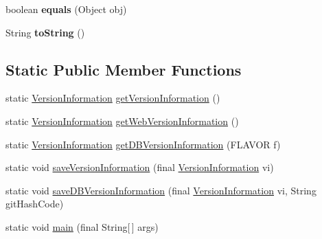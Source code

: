 \begin{DoxyCompactItemize}
\item 
\hypertarget{classgov_1_1fnal_1_1ppd_1_1dd_1_1util_1_1version_1_1VersionInformation_a2e640db116e069eabbc9f16b98678ca4}{boolean {\bfseries equals} (Object obj)}\label{classgov_1_1fnal_1_1ppd_1_1dd_1_1util_1_1version_1_1VersionInformation_a2e640db116e069eabbc9f16b98678ca4}

\item 
\hypertarget{classgov_1_1fnal_1_1ppd_1_1dd_1_1util_1_1version_1_1VersionInformation_ae6b3fbd1f3fd907536651c2a7d8160f0}{String {\bfseries to\-String} ()}\label{classgov_1_1fnal_1_1ppd_1_1dd_1_1util_1_1version_1_1VersionInformation_ae6b3fbd1f3fd907536651c2a7d8160f0}

\end{DoxyCompactItemize}
\subsection*{Static Public Member Functions}
\begin{DoxyCompactItemize}
\item 
static \hyperlink{classgov_1_1fnal_1_1ppd_1_1dd_1_1util_1_1version_1_1VersionInformation}{Version\-Information} \hyperlink{classgov_1_1fnal_1_1ppd_1_1dd_1_1util_1_1version_1_1VersionInformation_ae3b271fb533ff507acae7aeccbe4ffef}{get\-Version\-Information} ()
\item 
static \hyperlink{classgov_1_1fnal_1_1ppd_1_1dd_1_1util_1_1version_1_1VersionInformation}{Version\-Information} \hyperlink{classgov_1_1fnal_1_1ppd_1_1dd_1_1util_1_1version_1_1VersionInformation_a35a9492897005a8a48cfd9289dc9edff}{get\-Web\-Version\-Information} ()
\item 
static \hyperlink{classgov_1_1fnal_1_1ppd_1_1dd_1_1util_1_1version_1_1VersionInformation}{Version\-Information} \hyperlink{classgov_1_1fnal_1_1ppd_1_1dd_1_1util_1_1version_1_1VersionInformation_afccd7186968a5736b034f8600df1287b}{get\-D\-B\-Version\-Information} (F\-L\-A\-V\-O\-R f)
\item 
static void \hyperlink{classgov_1_1fnal_1_1ppd_1_1dd_1_1util_1_1version_1_1VersionInformation_ad92c421c9291308bc422e9b383b0fc4d}{save\-Version\-Information} (final \hyperlink{classgov_1_1fnal_1_1ppd_1_1dd_1_1util_1_1version_1_1VersionInformation}{Version\-Information} vi)
\item 
static void \hyperlink{classgov_1_1fnal_1_1ppd_1_1dd_1_1util_1_1version_1_1VersionInformation_afaa42342d99f1517e1a672b24f1f725a}{save\-D\-B\-Version\-Information} (final \hyperlink{classgov_1_1fnal_1_1ppd_1_1dd_1_1util_1_1version_1_1VersionInformation}{Version\-Information} vi, String git\-Hash\-Code)
\item 
static void \hyperlink{classgov_1_1fnal_1_1ppd_1_1dd_1_1util_1_1version_1_1VersionInformation_a1f1c0fa39067225a137925368674d424}{main} (final String\mbox{[}$\,$\mbox{]} args)
\end{DoxyCompactItemize}


